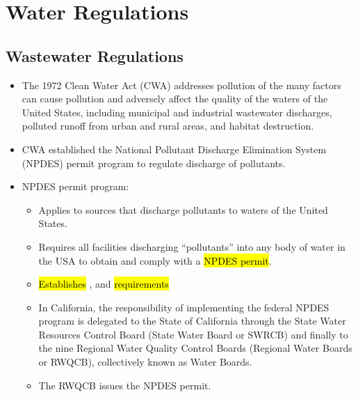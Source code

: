 
\chapter{Water Regulations}

\section{Wastewater Regulations}

\begin{itemize}
\item The 1972 Clean Water Act (CWA) addresses pollution of the many factors can cause pollution and adversely affect the quality of the waters of the United States, including municipal and industrial wastewater discharges, polluted runoff from urban and rural areas, and habitat destruction.\\
\item CWA established the National Pollutant Discharge Elimination System (NPDES) permit program to regulate discharge of pollutants.
\item NPDES permit program:
\begin{itemize}
\item Applies to sources that discharge pollutants to waters of the United States.
\item Requires all facilities discharging “pollutants” into any body of water in the USA to obtain and comply with a \hl{NPDES permit}.
\item \hl{Establishes} ,  and  \hl{requirements}\\
\item In California, the responsibility of implementing the federal NPDES program is delegated to the State of California through the State Water Resources Control Board (State Water Board or SWRCB) and finally to the nine Regional Water Quality Control Boards (Regional Water Boards or RWQCB), collectively known as Water Boards. 
\item The RWQCB issues the NPDES permit.
\end{itemize}
\end{itemize}











